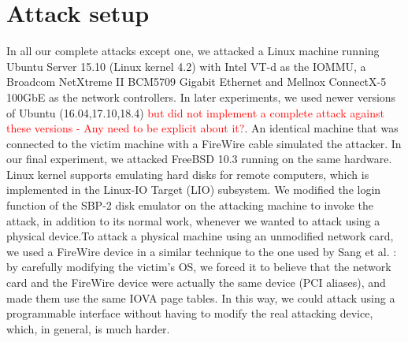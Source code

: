 \section{Attack setup}\label{sec:attack_setup}
In all our complete attacks except one, we attacked a Linux machine running Ubuntu Server 15.10 (Linux kernel 4.2) with Intel VT-d as the IOMMU, a Broadcom NetXtreme II BCM5709 Gigabit Ethernet and Mellnox ConnectX-5 100GbE as the network controllers. In later experiments, we used newer versions of Ubuntu (16.04,17.10,18.4) \textcolor{red}{but did not implement a complete attack against these versions - Any need to be explicit about it?}. An identical machine that was connected to the victim machine with a FireWire cable simulated the attacker. In our final experiment, we attacked FreeBSD 10.3 running on the same hardware.  Linux kernel supports emulating hard disks for remote computers, which is implemented in the Linux-IO Target (LIO) subsystem. We modified the login function of the SBP-2 disk emulator on the attacking machine to invoke the attack, in addition to its normal work, whenever we wanted to attack using a physical device.To attack a physical machine using an unmodified network card, we used a FireWire device in a similar technique to the one used by Sang et al. \cite{SLND10}: by carefully modifying the victim’s OS, we forced it to believe that the network card and the FireWire device were actually the same device (PCI aliases), and made them use the same IOVA page tables. In this way, we could attack using a programmable interface without having to modify the real attacking device, which, in general, is much harder.
